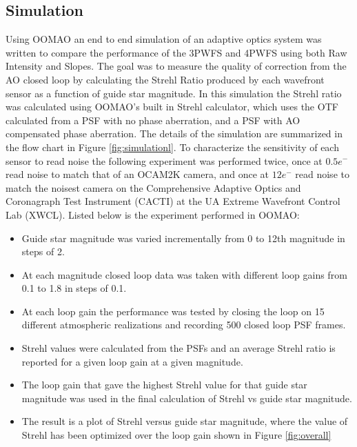 \subsection{Simulation}

Using OOMAO an end to end simulation of an adaptive optics system was written to compare the performance of the 3PWFS and 4PWFS using both Raw Intensity and Slopes.  The goal was to measure the quality of correction from the AO closed loop by calculating the Strehl Ratio produced by each wavefront sensor as a function of guide star magnitude. In this simulation the Strehl ratio was calculated using OOMAO's built in Strehl calculator, which uses the OTF calculated from a PSF with no phase aberration, and a PSF with AO compensated phase aberration. The details of the simulation are summarized in the flow chart in Figure \ref{fig:simulationl}. To characterize the sensitivity of each sensor to read noise the following experiment was performed twice, once at $0.5e^-$ read noise to match that of an OCAM2K camera, and once at $12 e^-$ read noise to match the noisest camera on the Comprehensive Adaptive Optics and Coronagraph Test Instrument (CACTI) at the UA Extreme Wavefront Control Lab (XWCL). Listed below is the experiment performed in OOMAO:

\begin{itemize}
    \item Guide star magnitude was varied incrementally from 0 to 12th magnitude in steps of 2.
    \item At each magnitude closed loop data was taken with different loop gains from 0.1 to 1.8 in steps of 0.1.
    \item At each loop gain the performance was tested by closing the loop on 15 different atmospheric realizations and recording 500 closed loop PSF frames. 
    \item Strehl values were calculated from the PSFs and an average Strehl ratio is reported for a given loop gain at a given magnitude.
    \item The loop gain that gave the highest Strehl value for that guide star magnitude was used in the final calculation of Strehl vs guide star magnitude.
    \item The result is a plot of Strehl versus guide star magnitude, where the value of Strehl has been optimized over the loop gain shown in Figure \ref{fig:overall}
\end{itemize}


